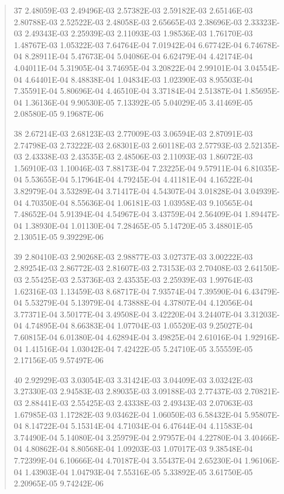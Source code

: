 \documentclass[letterpaper,10pt,english]{sphinxmanual}
\begin{document}
\begin{quote}
\begin{DUlineblock}{0em}
\item[] 37   2.48059E-03  2.49496E-03  2.57382E-03  2.59182E-03  2.65146E-03  2.80788E-03  2.52522E-03  2.48058E-03  2.65665E-03  2.38696E-03  2.33323E-03  2.49343E-03  2.25939E-03  2.11093E-03  1.98536E-03  1.76170E-03  1.48767E-03  1.05322E-03  7.64764E-04  7.01942E-04  6.67742E-04  6.74678E-04  8.28911E-04  5.47673E-04  5.04086E-04  6.62479E-04  4.42174E-04  4.04011E-04  5.31905E-04  3.74695E-04  3.20822E-04  2.99101E-04  3.04554E-04  4.64401E-04  8.48838E-04  1.04834E-03  1.02390E-03  8.95503E-04  7.35591E-04  5.80696E-04  4.46510E-04  3.37184E-04  2.51387E-04  1.85695E-04  1.36136E-04  9.90530E-05  7.13392E-05  5.04029E-05  3.41469E-05  2.08580E-05  9.19687E-06
\item[] 38   2.67214E-03  2.68123E-03  2.77009E-03  3.06594E-03  2.87091E-03  2.74798E-03  2.73222E-03  2.68301E-03  2.60118E-03  2.57793E-03  2.52135E-03  2.43338E-03  2.43535E-03  2.48506E-03  2.11093E-03  1.86072E-03  1.56910E-03  1.10046E-03  7.88173E-04  7.23225E-04  9.57911E-04  6.81035E-04  5.53655E-04  5.17964E-04  4.79245E-04  4.41181E-04  4.16522E-04  3.82979E-04  3.53289E-04  3.71417E-04  4.54307E-04  3.01828E-04  3.04939E-04  4.70350E-04  8.55636E-04  1.06181E-03  1.03958E-03  9.10565E-04  7.48652E-04  5.91394E-04  4.54967E-04  3.43759E-04  2.56409E-04  1.89447E-04  1.38930E-04  1.01130E-04  7.28465E-05  5.14720E-05  3.48801E-05  2.13051E-05  9.39229E-06
\item[] 39   2.80410E-03  2.90268E-03  2.98877E-03  3.02737E-03  3.00222E-03  2.89254E-03  2.86772E-03  2.81607E-03  2.73153E-03  2.70408E-03  2.64150E-03  2.55425E-03  2.53736E-03  2.43535E-03  2.25939E-03  1.99764E-03  1.62316E-03  1.13459E-03  8.68717E-04  7.93574E-04  7.39590E-04  6.43479E-04  5.53279E-04  5.13979E-04  4.73888E-04  4.37807E-04  4.12056E-04  3.77371E-04  3.50177E-04  3.49508E-04  3.42220E-04  3.24407E-04  3.31203E-04  4.74895E-04  8.66383E-04  1.07704E-03  1.05520E-03  9.25027E-04  7.60815E-04  6.01380E-04  4.62894E-04  3.49825E-04  2.61016E-04  1.92916E-04  1.41516E-04  1.03042E-04  7.42422E-05  5.24710E-05  3.55559E-05  2.17156E-05  9.57497E-06
\item[] 40   2.92929E-03  3.03054E-03  3.31424E-03  3.04409E-03  3.03242E-03  3.27330E-03  2.94583E-03  2.89035E-03  3.09188E-03  2.77437E-03  2.70821E-03  2.88441E-03  2.55425E-03  2.43338E-03  2.49343E-03  2.07063E-03  1.67985E-03  1.17282E-03  9.03462E-04  1.06050E-03  6.58432E-04  5.95807E-04  8.14722E-04  5.15314E-04  4.71034E-04  6.47644E-04  4.11583E-04  3.74490E-04  5.14080E-04  3.25979E-04  2.97957E-04  4.22780E-04  3.40466E-04  4.80862E-04  8.80568E-04  1.09203E-03  1.07017E-03  9.38548E-04  7.72399E-04  6.10666E-04  4.70187E-04  3.55437E-04  2.65230E-04  1.96106E-04  1.43903E-04  1.04793E-04  7.55316E-05  5.33892E-05  3.61750E-05  2.20965E-05  9.74242E-06

\end{DUlineblock}
\end{quote}
\end{document}
